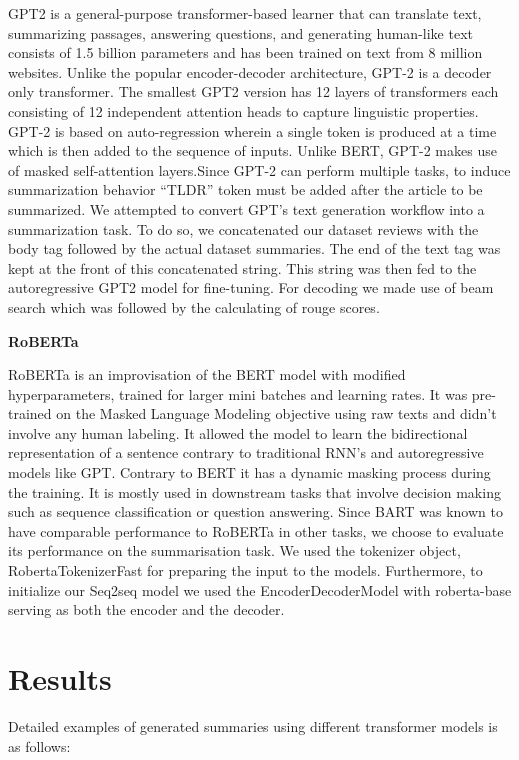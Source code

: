 \documentclass{article}
\begin{document}
\begin{appendices}
GPT2 \cite{gpt2ForSummarization} is a general-purpose transformer-based learner that can translate text, summarizing passages, answering questions, and generating human-like text consists of 1.5 billion parameters and has been trained on text from 8 million websites. Unlike the popular encoder-decoder architecture, GPT-2 is a decoder only transformer. The smallest GPT2 version has 12 layers of transformers each consisting of 12 independent attention heads to capture linguistic properties. GPT-2 is based on auto-regression wherein a single token is produced at a time which is then added to the sequence of inputs. Unlike BERT, GPT-2 makes use of masked self-attention layers.Since GPT-2 can perform multiple tasks, to induce summarization behavior “TLDR” token must be added after the article to be summarized.
 We attempted to convert GPT's text generation workflow into a summarization task.  To do so, we concatenated our dataset reviews with the body tag followed by the actual dataset summaries. The end of the text tag was kept at the front of this concatenated string. This string was then fed to the autoregressive GPT2 model for fine-tuning.  For decoding we made use of beam search which was followed by the calculating of rouge scores.

\textbf{RoBERTa}

RoBERTa \cite{originalRoBerta} is an improvisation of the BERT model with modified hyperparameters, trained for larger mini batches and learning rates. It was pre-trained on the Masked Language Modeling objective using raw texts and didn’t involve any human labeling. It allowed the model to learn the bidirectional representation of a sentence contrary to traditional RNN’s and autoregressive models like GPT. Contrary to BERT it has a dynamic masking process during the training. It is mostly used in downstream tasks that involve decision making such as sequence classification or question answering. Since BART was known to have comparable performance to RoBERTa in other tasks, we choose to evaluate its performance on the summarisation task. We used the tokenizer object, RobertaTokenizerFast for preparing the input to the models. Furthermore, to initialize our Seq2seq model we used the EncoderDecoderModel with roberta-base serving as both the encoder and the decoder.

\section{Results}
Detailed examples of generated summaries using different transformer models is as follows:


\end{appendices}
\end{document}
